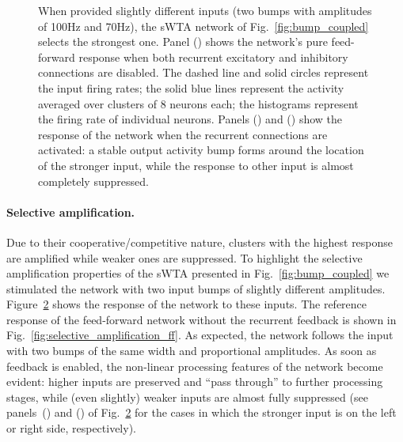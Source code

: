 \begin{figure}[h]
\begin{subfigure}{.32\textwidth}
\caption{}
\label{fig:selective_amplification_r}
\end{subfigure}
\caption[Population code selective amplification]{When provided slightly different inputs (two bumps with amplitudes of 100Hz and 70Hz), the \ac{sWTA} network of Fig.~\ref{fig:bump_coupled} selects the strongest one.  Panel () shows the network's pure feed-forward response when both recurrent excitatory and inhibitory connections are disabled. The dashed line and solid circles represent the input firing rates; the solid blue lines represent the activity averaged over clusters of 8 neurons each; the histograms represent the firing rate of individual neurons. Panels () and () show the response of the network when the recurrent connections are activated: a stable output activity bump forms around the location of the stronger input, while the response to other input is almost completely suppressed.}
\label{fig:selective_amplification}
\end{figure}

\paragraph{Selective amplification.}
Due to their cooperative/competitive nature, clusters with the highest response are amplified while weaker ones are suppressed.
To highlight the selective amplification properties of the \ac{sWTA} presented in Fig.~\ref{fig:bump_coupled} we stimulated the network with two input bumps of slightly different amplitudes.
Figure~\ref{fig:selective_amplification} shows the response of the network to these inputs.
The reference response of the feed-forward network without the recurrent feedback is shown in Fig.~\ref{fig:selective_amplification_ff}. As expected, the network follows the input with two bumps of the same width and proportional amplitudes.
As soon as feedback is enabled, the non-linear processing features of the network become evident: higher inputs are preserved and ``pass through'' to further processing stages, while (even slightly) weaker inputs are almost fully suppressed (see panels~() and () of Fig.~\ref{fig:selective_amplification} for the cases in which the stronger input is on the left or right side, respectively).

